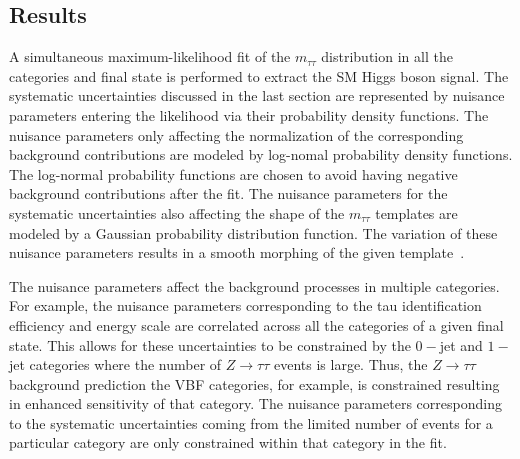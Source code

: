 \subsection{Results}

A simultaneous maximum-likelihood fit of the $m_{\tau\tau}$ distribution in all the categories and final state is performed to extract the SM Higgs boson signal. The systematic uncertainties discussed in the last section are represented by nuisance parameters entering the likelihood via their probability density functions. The nuisance parameters only affecting the normalization of the corresponding background contributions are modeled by log-nomal  probability density functions. The log-normal probability functions are chosen to avoid having negative background contributions after the fit. The nuisance parameters for the systematic uncertainties also affecting the shape of the $m_{\tau\tau}$ templates are modeled by a Gaussian probability distribution function. The variation of these nuisance parameters results in a smooth morphing of the given template~\cite{Conway-PhyStat}. 

The nuisance parameters affect the background processes in multiple categories. For example, the nuisance parameters corresponding to the tau identification efficiency and energy scale  are correlated across all the categories of a given final state. This allows for these uncertainties to be constrained by the $0-$jet and $1-$jet categories where the number of $Z\rightarrow\tau\tau$ events is large. Thus, the $Z\rightarrow\tau\tau$ background prediction the VBF categories, for example, is constrained resulting in enhanced sensitivity of that category. The nuisance parameters corresponding to the systematic uncertainties coming from the limited number of events for a particular category are only constrained within that category in the fit. 

